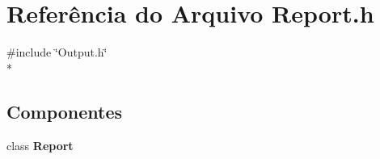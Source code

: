 \section{Referência do Arquivo Report.\+h}
\label{_report_8h}
{\ttfamily \#include \char`\"{}Output.\+h\char`\"{}}\\*
\subsection*{Componentes}
\begin{DoxyCompactItemize}
\item 
class {\bf Report}
\end{DoxyCompactItemize}
